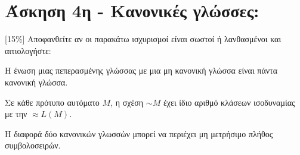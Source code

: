 \section{Άσκηση 4η - Κανονικές γλώσσες:}
\label{sec:Exercise_4}
\doublespacing

[15\%]  Αποφανθείτε αν οι παρακάτω ισχυρισμοί είναι σωστοί ή λανθασμένοι και αιτιολογήστε:

\bm{\textcolor{blue}{(α) [5\%]}} Η ένωση μιας πεπερασμένης γλώσσας με μια μη κανονική γλώσσα είναι πάντα κανονική
γλώσσα.

\bm{\textcolor{blue}{(β) [5\%]}} Σε κάθε πρότυπο αυτόματο $M$, η σχέση $\sim\!\!\!{M}$ έχει ίδιο αριθμό κλάσεων
ισοδυναμίας με την $\approx\!\!{L}(M)$.

\bm{\textcolor{blue}{(γ) [5\%]}} Η διαφορά δύο κανονικών γλωσσών μπορεί να περιέχει μη μετρήσιμο πλήθος
συμβολοσειρών.
\clearpage